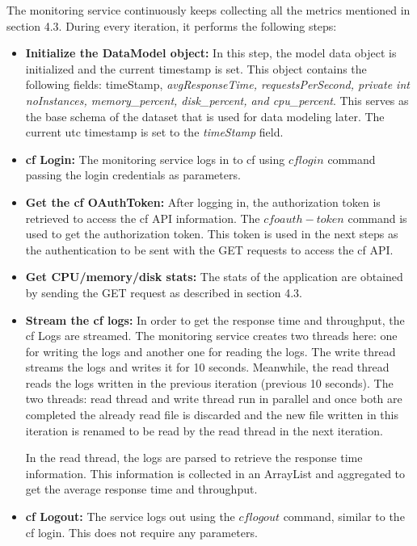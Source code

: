 \documentclass[article,type=msc,colorback,12pt,accentcolor=tud8b,table]{tudthesis}
\begin{document}
	The monitoring service continuously keeps collecting all the metrics mentioned in section 4.3. During every iteration, it performs the following steps:
	\begin{itemize}
		\item{\textbf{Initialize the DataModel object:}} In this step, the model data object is initialized and the current timestamp is set. This object contains the following fields: timeStamp, \textit{avgResponseTime, requestsPerSecond, private int noInstances, memory\_percent, disk\_percent, and cpu\_percent}. This serves as the base schema of the dataset that is used for data modeling later. The current \gls{utc} timestamp is set to the \textit{timeStamp} field.

\item{\textbf{\gls{cf} Login:}} The monitoring service logs in to \gls{cf} using $cf login$ command passing the login credentials as parameters.

\item{\textbf{Get the \gls{cf} OAuthToken:}} After logging in, the authorization token is retrieved to access the \gls{cf} API information. The $cf oauth-token$ command is used to get the authorization token. This token is used in the next steps as the authentication to be sent with the GET requests to access the \gls{cf} API.
		
\item{\textbf{Get CPU/memory/disk stats:}} 
The stats of the application are obtained by sending the GET request as described in section 4.3.
		
\item{\textbf{Stream the \gls{cf} logs:}} In order to get the response time and throughput, the \gls{cf} Logs are streamed. The monitoring service creates two threads here: one for writing the logs and another one for reading the logs. The write thread streams the logs and writes it for 10 seconds. Meanwhile, the read thread reads the logs written in the previous iteration (previous 10 seconds). The two threads: read thread and write thread run in parallel and once both are completed the already read file is discarded and the new file written in this iteration is renamed to be read by the read thread in the next iteration.

In the read thread, the logs are parsed to retrieve the response time information. This information is collected in an ArrayList and aggregated to get the average response time and throughput. 
		
\item{\textbf{\gls{cf} Logout:}} The service logs out using the $cf logout$ command, similar to the cf login. This does not require any parameters.
		

\end{itemize}
\end{document}
